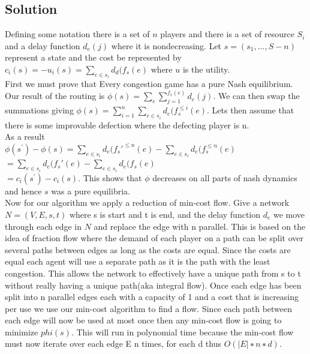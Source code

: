 \documentclass[11pt]{article}
\begin{document}
\begin{enumerate}
\subsection{Solution}
Defining some notation there is a set of $n$ players and there is a set of resource $S_i$ and a delay function $d_e(j)$ where it is nondecreasing. Let $s = (s_1,...,S-n)$ represent a state and the cost be represented by $c_i(s) = -u_i(s) = \sum_{e \in s_i} d_d(f_s(e)$  where $u$ is the utility.\\
First we must prove that Every congestion game
has a pure Nash equilibrium. Our result of the routing is $\phi (s) = \sum_e \sum_{j=1}^{f_s(e)} d_e(j)$. We can then swap the summations giving $\phi(s) = \sum_{i=1}^{n} \sum_{e \in s_i} d_e(f_s^{\le i}(e)$. Lets then assume that there is some improvable defection where the defecting player is n. \\
As a result\\ $\phi(s^') - \phi(s) = \sum_{e \in s_i} d_e(f_s'^{\le n}(e) - \sum_{e \in s_i} d_e(f_s^{\le n}(e) $ \\ 
$= \sum_{e \in s_i} d_e(f_s'(e) - \sum_{e \in s_i} d_e(f_s(e)$ \\
$= c_i(s^') - c_i(s)$. This shows that  $\phi$ decreases on all parts of nash dynamics and hence $s$ was a pure equilibria.\\
Now for our algorithm we apply a reduction of min-cost flow. Give a network $N=(V,E,s,t)$ where s is start and t is end, and the delay function $d_e$ we move through each edge in $N$ and replace the edge with n parallel. This is based on the idea of fraction flow where the demand of each player on a path can be split over several paths between edges as long as the costs are equal. Since the costs are equal each agent will use a separate path as it is the path with the least congestion. This allows the network to effectively have a unique path from s to t without really having a unique path(aka integral flow). Once each edge has been split into n parallel edges each with a capacity of 1 and a cost that is increasing per use we use our min-cost algorithm to find a flow. Since each path between each edge will now be used at most once then any min-cost flow is going to minimize $phi(s)$. This will run in polynomial time because the min-cost flow must now iterate over each edge E n times, for each d thus $O(|E|∗n∗d)$.
\end{enumerate}
\end{document}
